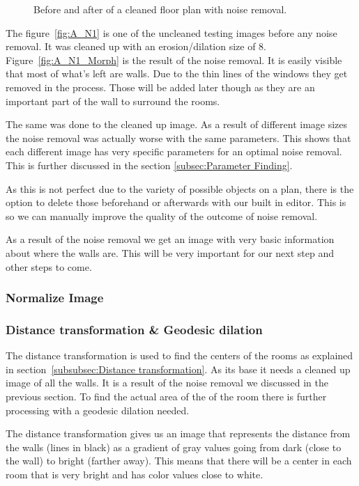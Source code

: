 \begin{figure}[h]
	\centering
	\hfill
	\caption{Before and after of a cleaned floor plan with noise removal.}
\end{figure}

The figure~\ref{fig:A_N1} is one of the uncleaned testing images before any noise removal. It was cleaned up with an erosion/dilation size of 8. Figure~\ref{fig:A_N1_Morph} is the result of the noise removal. It is easily visible that most of what's left are walls. Due to the thin lines of the windows they get removed in the process. Those will be added later though as they are an important part of the wall to surround the rooms.

The same was done to the cleaned up image. As a result of different image sizes the noise removal was actually worse with the same parameters. This shows that each different image has very specific parameters for an optimal noise removal. This is further discussed in the section \ref{subsec:Parameter Finding}.

As this is not perfect due to the variety of possible objects on a plan, there is the option to delete those beforehand or afterwards with our built in editor. This is so we can manually improve the quality of the outcome of noise removal.

As a result of the noise removal we get an image with very basic information about where the walls are. This will be very important for our next step and other steps to come.
\subsubsection{Normalize Image}
\subsubsection{Distance transformation \& Geodesic dilation}
The distance transformation is used to find the centers of the rooms as explained in section~\ref{subsubsec:Distance transformation}. As its base it needs a cleaned up image of all the walls. It is a result of the noise removal we discussed in the previous section. To find the actual area of the of the room there is further processing with a geodesic dilation needed.

The distance transformation gives us an image that represents the distance from the walls (lines in black) as a gradient of gray values going from dark (close to the wall) to bright (farther away). This means that there will be a center in each room that is very bright and has color values close to white.


